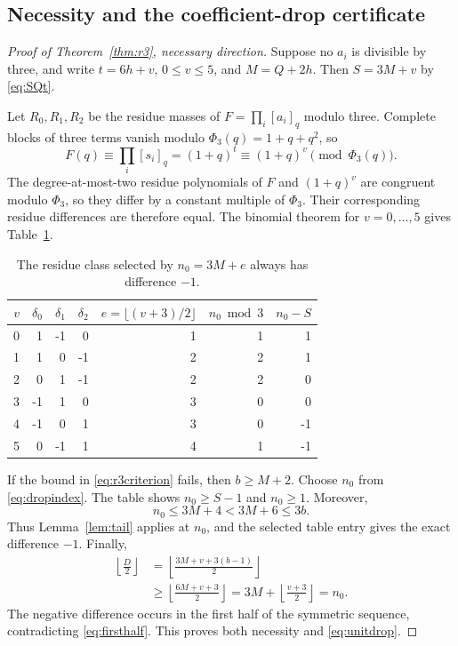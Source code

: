 \documentclass[11pt]{article}
\theoremstyle{research}
\theoremstyle{definition}
\newcommand{\qi}[1]{[#1]_q}
\numberwithin{equation}{section}
\begin{document}
\subsection{Necessity and the coefficient-drop certificate}
\begin{proof}[Proof of Theorem~\ref{thm:r3}, necessary direction]
Suppose no $a_i$ is divisible by three, and write
$t=6h+v$, $0\le v\le5$, and $M=Q+2h$.
Then $S=3M+v$ by \eqref{eq:SQt}.

Let $R_0,R_1,R_2$ be the residue masses of
$F=\prod_i\qi{a_i}$ modulo three. Complete blocks of three terms vanish
modulo $\Phi_3(q)=1+q+q^2$, so
\begin{equation}\label{eq:corecongruence}
 F(q)\equiv\prod_i\qi{s_i}=(1+q)^t
       \equiv(1+q)^v\pmod{\Phi_3(q)}.
\end{equation}
The degree-at-most-two residue polynomials of $F$ and $(1+q)^v$
are congruent modulo $\Phi_3$, so they differ by a constant multiple
of $\Phi_3$. Their corresponding residue differences are therefore equal.
The binomial theorem for $v=0,\ldots,5$ gives
Table~\ref{tab:residues}.

\begin{table}[htbp]
\centering
\begin{tabular}{@{}rrrrrrr@{}}
\toprule
$v$ & $\delta_0$ & $\delta_1$ & $\delta_2$
 & $e=\lfloor(v+3)/2\rfloor$ & $n_0\bmod3$ & $n_0-S$ \\
\midrule
0 &  1 & -1 &  0 & 1 & 1 &  1 \\
1 &  1 &  0 & -1 & 2 & 2 &  1 \\
2 &  0 &  1 & -1 & 2 & 2 &  0 \\
3 & -1 &  1 &  0 & 3 & 0 &  0 \\
4 & -1 &  0 &  1 & 3 & 0 & -1 \\
5 &  0 & -1 &  1 & 4 & 1 & -1 \\
\bottomrule
\end{tabular}
\caption{The residue class selected by $n_0=3M+e$ always has difference $-1$.}
\label{tab:residues}
\end{table}

If the bound in \eqref{eq:r3criterion} fails, then $b\ge M+2$.
Choose $n_0$ from \eqref{eq:dropindex}.
The table shows $n_0\ge S-1$ and $n_0\ge1$.
Moreover,
\[
 n_0\le3M+4<3M+6\le3b.
\]
Thus Lemma~\ref{lem:tail} applies at $n_0$, and the selected table entry
gives the exact difference $-1$.
Finally,
\begin{align*}
 \left\lfloor\frac{D}{2}\right\rfloor
 &=\left\lfloor\frac{3M+v+3(b-1)}{2}\right\rfloor\\
 &\ge\left\lfloor\frac{6M+v+3}{2}\right\rfloor
 =3M+\left\lfloor\frac{v+3}{2}\right\rfloor=n_0.
\end{align*}
The negative difference occurs in the first half of the symmetric
sequence, contradicting \eqref{eq:firsthalf}.
This proves both necessity and \eqref{eq:unitdrop}.
\end{proof}
\end{document}
